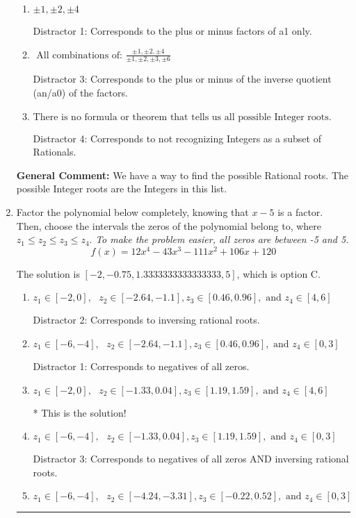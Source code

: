 \documentclass{extbook}[14pt]
\newcommand{\litem}[1]{\item #1

\rule{\textwidth}{0.4pt}}
\begin{document}
\begin{enumerate}
{\begin{enumerate}[label=\Alph*.]
* This is the solution \textbf{since we asked for the possible Integer roots}!
\item \( \pm 1,\pm 2,\pm 4 \)

 Distractor 1: Corresponds to the plus or minus factors of a1 only.
\item \( \text{ All combinations of: }\frac{\pm 1,\pm 2,\pm 4}{\pm 1,\pm 2,\pm 3,\pm 6} \)

 Distractor 3: Corresponds to the plus or minus of the inverse quotient (an/a0) of the factors. 
\item \( \text{There is no formula or theorem that tells us all possible Integer roots.} \)

 Distractor 4: Corresponds to not recognizing Integers as a subset of Rationals.
\end{enumerate}

\textbf{General Comment:} We have a way to find the possible Rational roots. The possible Integer roots are the Integers in this list.
}
\litem{
Factor the polynomial below completely, knowing that $x-5$ is a factor. Then, choose the intervals the zeros of the polynomial belong to, where $z_1 \leq z_2 \leq z_3 \leq z_4$. \textit{To make the problem easier, all zeros are between -5 and 5.}
\[ f(x) = 12x^{4} -43 x^{3} -111 x^{2} +106 x + 120 \]

The solution is \( [-2, -0.75, 1.3333333333333333, 5] \), which is option C.\begin{enumerate}[label=\Alph*.]
\item \( z_1 \in [-2, 0], \text{   }  z_2 \in [-2.64, -1.1], z_3 \in [0.46, 0.96], \text{   and   } z_4 \in [4, 6] \)

 Distractor 2: Corresponds to inversing rational roots.
\item \( z_1 \in [-6, -4], \text{   }  z_2 \in [-2.64, -1.1], z_3 \in [0.46, 0.96], \text{   and   } z_4 \in [0, 3] \)

 Distractor 1: Corresponds to negatives of all zeros.
\item \( z_1 \in [-2, 0], \text{   }  z_2 \in [-1.33, 0.04], z_3 \in [1.19, 1.59], \text{   and   } z_4 \in [4, 6] \)

* This is the solution!
\item \( z_1 \in [-6, -4], \text{   }  z_2 \in [-1.33, 0.04], z_3 \in [1.19, 1.59], \text{   and   } z_4 \in [0, 3] \)

 Distractor 3: Corresponds to negatives of all zeros AND inversing rational roots.
\item \( z_1 \in [-6, -4], \text{   }  z_2 \in [-4.24, -3.31], z_3 \in [-0.22, 0.52], \text{   and   } z_4 \in [0, 3] \)


\end{enumerate}}
\end{enumerate}
\end{document}
